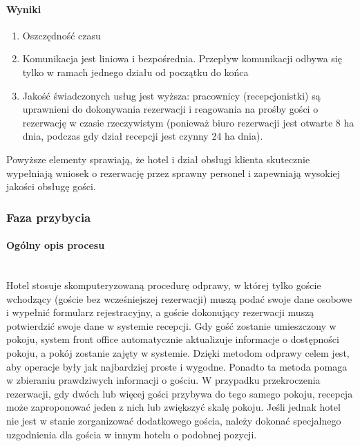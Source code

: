 \documentclass[a4paper, 12pt]{article}
\begin{document}
\paragraph{Wyniki}
\begin{enumerate}
	\item Oszczędność czasu
	\item Komunikacja jest liniowa i bezpośrednia. Przepływ komunikacji odbywa się tylko w ramach jednego działu od początku do końca
	\item Jakość świadczonych usług jest wyższa: pracownicy (recepcjonistki) są uprawnieni do dokonywania rezerwacji i reagowania na prośby gości o rezerwację w czasie rzeczywistym (ponieważ biuro rezerwacji jest otwarte 8 ha dnia, podczas gdy dział recepcji jest czynny 24 ha dnia).
\end{enumerate}
\hspace{1cm} Powyższe elementy sprawiają, że hotel i dział obsługi klienta skutecznie wypełniają wniosek o rezerwację przez sprawny personel i zapewniają wysokiej jakości obsługę gości.
\subsubsection{Faza przybycia}
\paragraph{Ogólny opis procesu}\mbox{}\\
Hotel stosuje skomputeryzowaną procedurę odprawy, w której tylko goście wchodzący (goście bez wcześniejszej rezerwacji) muszą podać swoje dane osobowe i wypełnić formularz rejestracyjny, a goście dokonujący rezerwacji muszą potwierdzić swoje dane w systemie recepcji.\newline
\hspace*{1cm}Gdy gość zostanie umieszczony w pokoju, system front office automatycznie aktualizuje informacje o dostępności pokoju, a pokój zostanie zajęty w systemie. Dzięki metodom odprawy celem jest, aby operacje były jak najbardziej proste i wygodne. Ponadto ta metoda pomaga w zbieraniu prawdziwych informacji o gościu.\newline
\hspace*{1cm}W przypadku przekroczenia rezerwacji, gdy dwóch lub więcej gości przybywa do tego samego pokoju, recepcja może zaproponować jeden z nich lub zwiększyć skalę pokoju. Jeśli jednak hotel nie jest w stanie zorganizować dodatkowego gościa, należy dokonać specjalnego uzgodnienia dla gościa w innym hotelu o podobnej pozycji.
\end{document}
